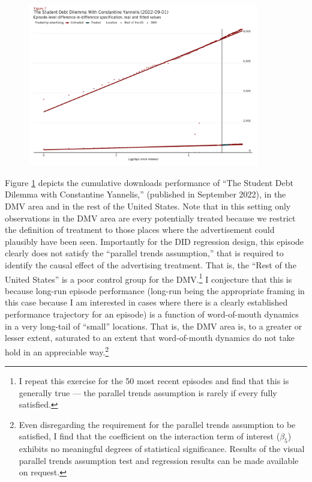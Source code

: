\documentclass[11pt, letterpaper, twoside]{article}
\begin{document}
\begin{figure}[!htb]
  \centering
  \includegraphics[width=0.9\textwidth]{figures/yannelis_did_whole_country_plot.png}
  \caption{}
  \label{fig:yannelis-did-RoUS}
\end{figure}

Figure \ref{fig:yannelis-did-RoUS} depicts the cumulative downloads performance of ``The Student Debt Dilemma with Constantine Yannelis,'' (published in September 2022), in the DMV area and in the rest of the United States. Note that in this setting only observations in the DMV area are every potentially treated because we restrict the definition of treatment to those places where the advertisement could plausibly have been seen. Importantly for the DID regression design, this episode clearly does not satisfy the ``parallel trends assumption,'' that is required to identify the causal effect of the advertising treatment. That is, the ``Rest of the United States'' is a poor control group for the DMV.\footnote{I repeat this exercise for the 50 most recent episodes and find that this is generally true --- the parallel trends assumption is rarely if every fully satisfied.} I conjecture that this is because long-run episode performance (long-run being the appropriate framing in this case because I am interested in cases where there is a clearly established performance trajectory for an episode) is a function of word-of-mouth dynamics in a very long-tail of ``small'' locations. That is, the DMV area is, to a greater or lesser extent, saturated to an extent that word-of-mouth dynamics do not take hold in an appreciable way.\footnote{Even disregarding the requirement for the parallel trends assumption to be satisfied, I find that the coefficient on the interaction term of interest ($\beta_5$) exhibits no meaningful degrees of statistical significance. Results of the visual parallel trends assumption test and regression results can be made available on request.}\\
\end{document}
